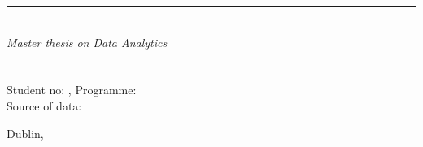 \begin{titlepage} %
    \raggedleft %
    \rule{2pt}{\textheight} %
    \hspace{0.05\textwidth} %
    \parbox[b]{0.8\textwidth}{ %

        {\Huge\bfseries \newtitle}\\[2\baselineskip] %
        {\large\textit{Master thesis on Data Analytics}}\\[4\baselineskip] %
        {\Large\textsc{\newauthor}}\\ \\%
        {Student no: {\bf \studentno}, Programme: {\bf \programme}}\\
        Source of data: {\bf \data}\\
        \vspace{0.5\textheight} %

        {\noindent Dublin, ~\newdate}\\[\baselineskip] %
    }

\end{titlepage}
